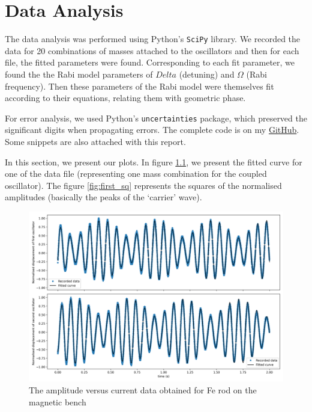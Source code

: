 \chapter{\label{method}Data Analysis}
The data analysis was performed using Python's \texttt{SciPy} library. We recorded the data for 20 combinations of masses attached to the oscillators and then for each file, the fitted parameters were found. Corresponding to each fit parameter, we found the the Rabi model parameters of $ Delta $ (detuning) and $ \Omega $ (Rabi frequency). Then these parameters of the Rabi model were themselves fit according to their equations, relating them with geometric phase.

For error analysis, we used Python's  \texttt{uncertainties} package, which preserved the significant digits when propagating errors. The complete code is on my \href{https://github.com/peakcipher/p442-integrated-lab/tree/master/IV.%20Coupled%20Oscillator}{GitHub}. Some snippets are also attached with this report.

In this section, we present our plots. In figure \ref{fig:first}, we present the fitted curve for one of the data file (representing one mass combination for the coupled oscillator). The figure \ref{fig:first_sq} represents the squares of the normalised amplitudes (basically the peaks of the `carrier' wave).

\begin{figure}[H]
	\centering
	\includegraphics[scale=0.4]{01.png}
	\caption{The amplitude versus current data obtained for Fe rod on the magnetic bench}
	\label{fig:first}
\end{figure}

